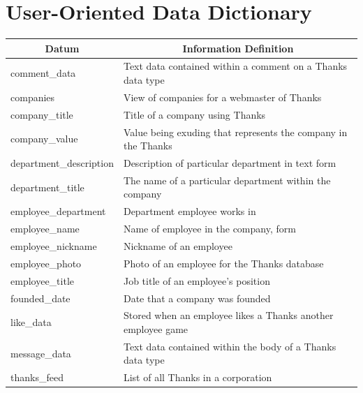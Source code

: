 \documentclass[11pt]{report}
\begin{document}
\section{User-Oriented Data Dictionary}
\begin{table}[h]
\begin{tabular}{|l|l|}
\hline
\multicolumn{1}{|c|}{\textbf{Datum}} & \multicolumn{1}{c|}{\textbf{Information Definition}}                            \\ \hline
comment\_data                        & Text data contained within a comment on a Thanks data type                      \\ \hline
companies                            & View of companies for a webmaster of Thanks                                     \\ \hline
company\_title                       & Title of a company using Thanks                                                 \\ \hline
company\_value                       & Value being exuding that represents the company in the Thanks \\ \hline
department\_description              & Description of particular department in text form                               \\ \hline
department\_title                    & The name of a particular department within the company                          \\ \hline
employee\_department                 & Department employee works in                                                    \\ \hline
employee\_name                       & Name of employee in the company, form                                           \\ \hline
employee\_nickname                   & Nickname of an employee                                                         \\ \hline
employee\_photo                      & Photo of an employee for the Thanks database                                    \\ \hline
employee\_title                      & Job title of an employee’s position                                             \\ \hline
founded\_date                        & Date that a company was founded                                                 \\ \hline
like\_data                           & Stored when an employee likes a Thanks another employee game                    \\ \hline
message\_data                        & Text data contained within the body of a Thanks data type                       \\ \hline
thanks\_feed                         & List of all Thanks in a corporation                                             \\ \hline
\end{tabular}
\end{table}
\clearpage
\end{document}
